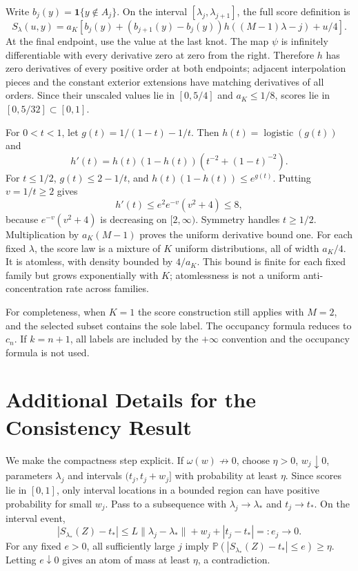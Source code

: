 \documentclass{article}
\newcommand{\PP}{\mathbb P}
\newcommand{\ind}{\mathbf 1}
\begin{document}
Write $b_j(y)=\ind\{y\notin A_j\}$. On the interval $[\lambda_j,\lambda_{j+1}]$, the full score definition is
\begin{equation}
 S_\lambda(u,y)=a_K\left[b_j(y)+(b_{j+1}(y)-b_j(y))h((M-1)\lambda-j)+u/4\right].
\end{equation}
At the final endpoint, use the value at the last knot. The map $\psi$ is infinitely differentiable with every derivative zero at zero from the right. Therefore $h$ has zero derivatives of every positive order at both endpoints; adjacent interpolation pieces and the constant exterior extensions have matching derivatives of all orders. Since their unscaled values lie in $[0,5/4]$ and $a_K\le1/8$, scores lie in $[0,5/32]\subset[0,1]$.

For $0<t<1$, let $g(t)=1/(1-t)-1/t$. Then $h(t)=\operatorname{logistic}(g(t))$ and
\begin{equation}
 h'(t)=h(t)(1-h(t))\left(t^{-2}+(1-t)^{-2}\right).
\end{equation}
For $t\le1/2$, $g(t)\le2-1/t$, and $h(t)(1-h(t))\le e^{g(t)}$. Putting $v=1/t\ge2$ gives
\begin{equation}
 h'(t)\le e^2 e^{-v}(v^2+4)\le8,
\end{equation}
because $e^{-v}(v^2+4)$ is decreasing on $[2,\infty)$. Symmetry handles $t\ge1/2$. Multiplication by $a_K(M-1)$ proves the uniform derivative bound one. For each fixed $\lambda$, the score law is a mixture of $K$ uniform distributions, all of width $a_K/4$. It is atomless, with density bounded by $4/a_K$. This bound is finite for each fixed family but grows exponentially with $K$; atomlessness is not a uniform anti-concentration rate across families.

For completeness, when $K=1$ the score construction still applies with $M=2$, and the selected subset contains the sole label. The occupancy formula reduces to $c_n$. If $k=n+1$, all labels are included by the $+\infty$ convention and the occupancy formula is not used.

\section{Additional Details for the Consistency Result}\label{app:consistency}

We make the compactness step explicit. If $\omega(w)\not\to0$, choose $\eta>0$, $w_j\downarrow0$, parameters $\lambda_j$ and intervals $(t_j,t_j+w_j]$ with probability at least $\eta$. Since scores lie in $[0,1]$, only interval locations in a bounded region can have positive probability for small $w_j$. Pass to a subsequence with $\lambda_j\to\lambda_*$ and $t_j\to t_*$. On the interval event,
\begin{equation}
 |S_{\lambda_*}(Z)-t_*|\le L\|\lambda_j-\lambda_*\|+w_j+|t_j-t_*|=:e_j\to0.
\end{equation}
For any fixed $e>0$, all sufficiently large $j$ imply $\PP(|S_{\lambda_*}(Z)-t_*|\le e)\ge\eta$. Letting $e\downarrow0$ gives an atom of mass at least $\eta$, a contradiction.
\end{document}
